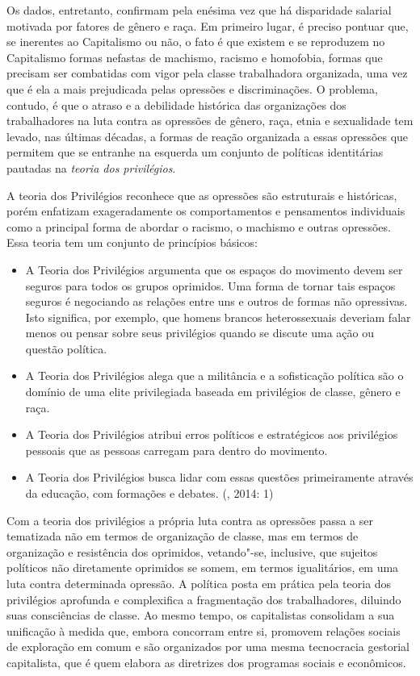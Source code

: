 Os dados, entretanto, confirmam pela enésima vez que há disparidade
salarial motivada por fatores de gênero e raça. Em primeiro lugar, é
preciso pontuar que, se inerentes ao Capitalismo ou não, o fato é que
existem e se reproduzem no Capitalismo formas nefastas de machismo,
racismo e homofobia, formas que precisam ser combatidas com vigor pela
classe trabalhadora organizada, uma vez que é ela a mais prejudicada
pelas opressões e discriminações. O problema, contudo, é que o atraso e
a debilidade histórica das organizações dos trabalhadores na luta contra
as opressões de gênero, raça, etnia e sexualidade tem levado, nas
últimas décadas, a formas de reação organizada a essas opressões que
permitem que se entranhe na esquerda um conjunto de políticas
identitárias pautadas na \emph{teoria dos privilégios}.

A teoria dos Privilégios reconhece que as opressões são estruturais e
históricas, porém enfatizam exageradamente os comportamentos e
pensamentos individuais como a principal forma de abordar o racismo, o
machismo e outras opressões. Essa teoria tem um conjunto de princípios
básicos:

\begin{itemize}
\item A Teoria dos Privilégios argumenta que os espaços do
movimento devem ser seguros para todos os grupos oprimidos. Uma forma de
tornar tais espaços seguros é negociando as relações entre uns e outros
de formas não opressivas. Isto significa, por exemplo, que homens
brancos heterossexuais deveriam falar menos ou pensar sobre seus
privilégios quando se discute uma ação ou questão política.

\item A Teoria dos Privilégios alega que a militância e a
sofisticação política são o domínio de uma elite privilegiada baseada em
privilégios de classe, gênero e raça.

\item A Teoria dos Privilégios atribui erros políticos e
estratégicos aos privilégios pessoais que as pessoas carregam para
dentro do movimento.

\item A Teoria dos Privilégios busca lidar com essas questões
primeiramente através da educação, com formações e debates. (, 2014:
1)
\end{itemize}

Com a teoria dos privilégios a própria luta contra as opressões passa a
ser tematizada não em termos de organização de classe, mas em termos de
organização e resistência dos oprimidos, vetando"-se, inclusive, que
sujeitos políticos não diretamente oprimidos se somem, em termos
igualitários, em uma luta contra determinada opressão. A política posta
em prática pela teoria dos privilégios aprofunda e complexifica a
fragmentação dos trabalhadores, diluindo suas consciências de classe. Ao
mesmo tempo, os capitalistas consolidam a sua unificação à medida que,
embora concorram entre si, promovem relações sociais de exploração em
comum e são organizados por uma mesma tecnocracia gestorial capitalista,
que é quem elabora as diretrizes dos programas sociais e econômicos.

